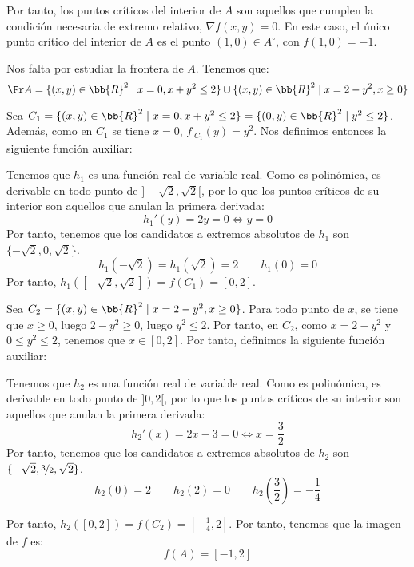\begin{ejercicio}
    Por tanto, los puntos críticos del interior de $A$ son aquellos que
    cumplen la condición necesaria de extremo relativo, $\nabla f(x,y)=0$. En este caso, el único punto crítico del interior de $A$ es el punto $(1,0)\in A^\circ$,
    con $f(1,0)=-1$.

    Nos falta por estudiar la frontera de $A$. Tenemos que:
    \begin{equation*}
        \Fr A = \{(x,y)\in \bb{R}^2\mid x=0, x+y^2\leq 2\} \cup \{(x,y)\in \bb{R}^2\mid x=2-y^2, x\geq 0\}
    \end{equation*}

    Sea $C_1=\{(x,y)\in \bb{R}^2\mid x=0, x+y^2\leq 2\}=\{(0,y)\in \bb{R}^2\mid y^2\leq 2\}$.
    Además, como en $C_1$ se tiene $x=0$, $f_{\big| C_1}(y)=y^2$. Nos definimos entonces la siguiente función auxiliar:

    Tenemos que $h_1$ es una función real de variable real. Como es polinómica, es derivable en todo punto de $]-\sqrt{2},\sqrt{2}[$, por lo que los puntos críticos de su interior son aquellos que anulan la primera derivada:
    \begin{equation*}
        h_1'(y) = 2y = 0 \Longleftrightarrow y=0
    \end{equation*}
    Por tanto, tenemos que los candidatos a extremos absolutos de $h_1$ son $\{-\sqrt{2},0,\sqrt{2}\}$.
    \begin{equation*}
        h_1(-\sqrt{2})=h_1(\sqrt{2})=2 \qquad h_1(0)=0
    \end{equation*}
    Por tanto, $h_1\left(\left[-\sqrt{2},\sqrt{2}\right]\right)=f(C_1) = [0,2]$.

    Sea $C_2=\{(x,y)\in \bb{R}^2\mid x=2-y^2, x\geq 0\}$. Para todo punto de $x$, se tiene que $x\geq 0$, luego $2-y^2\geq 0$, luego $y^2\leq 2$.
    Por tanto, en $C_2$, como $x=2-y^2$ y $0\leq y^2\leq 2$, tenemos que $x\in [0,2]$. Por tanto, definimos la siguiente función auxiliar:

    Tenemos que $h_2$ es una función real de variable real. Como es polinómica, es derivable en todo punto de $]0,2[$, por lo que los puntos críticos de su interior son aquellos que anulan la primera derivada:
    \begin{equation*}
        h_2'(x) = 2x -3 = 0 \Longleftrightarrow x=\frac{3}{2}
    \end{equation*}
    Por tanto, tenemos que los candidatos a extremos absolutos de $h_2$ son $\{-\sqrt{2},\nicefrac{3}{2},\sqrt{2}\}$.
    \begin{equation*}
        h_2(0)=2 \qquad h_2(2)=0 \qquad h_2\left(\frac{3}{2}\right) = -\frac{1}{4}
    \end{equation*}

    Por tanto, $h_2\left(\left[0,2\right]\right)=f(C_2) = \left[-\frac{1}{4}, 2\right]$. Por tanto, tenemos que la imagen de $f$ es:
    \begin{equation*}
        f(A) = \left[-1, 2\right]
    \end{equation*}
\end{ejercicio}
    


